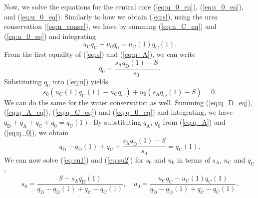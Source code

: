 \documentclass{article}
\numberwithin{equation}{section} %
\begin{document}
Now, we solve the equations for the central core (\ref{eq:q_0_eq}), (\ref{eq:s_0_eq}), and (\ref{eq:u_0_eq}).
Similarly to how we obtain (\ref{eq:s}), using the urea conservation (\ref{eq:u_consv}), we have by summing (\ref{eq:u_C_eq}) and (\ref{eq:u_0_eq}) and integrating
\begin{equation}\label{eq:u}
    u_\mathrm{C}q_\mathrm{C}+u_0q_0 = u_\mathrm{C}(1)q_\mathrm{C}(1).
\end{equation}
From the first equality of (\ref{eq:s}) and (\ref{eq:q_A}), we can write
\begin{equation}\label{eq:q_0}
    q_0 =\frac{s_\mathrm{A}q_\mathrm{D}(1)-S}{s_0}.
\end{equation}
Substituting $q_0$ into (\ref{eq:u}) yields
\begin{equation}\label{eq:su1}
    s_0\left( u_\mathrm{C}(1)q_\mathrm{C}(1) - u_\mathrm{C}q_\mathrm{C} \right) + u_0\left( s_\mathrm{A}q_\mathrm{D}(1) - S \right) = 0.
\end{equation}
We can do the same for the water conservation as well.
Summing (\ref{eq:q_D_eq}), (\ref{eq:q_A_eq}), (\ref{eq:q_C_eq}) and (\ref{eq:q_0_eq}) and integrating, we have $q_\mathrm{D}+q_\mathrm{A}+q_\mathrm{C}+q_0 = q_\mathrm{C}(1)$.
By substituting $q_\mathrm{A}$, $q_0$ from (\ref{eq:q_A}) and (\ref{eq:q_0}), we obtain
\begin{equation}\label{eq:su2}
    q_\mathrm{D}-q_\mathrm{D}(1)+q_\mathrm{C}+\frac{s_\mathrm{A}q_\mathrm{D}(1) - S}{s_0} = q_\mathrm{C}(1).
\end{equation}
We can now solve (\ref{eq:su1}) and (\ref{eq:su2}) for $s_0$ and $u_0$ in terms of $\mathrm{s}_A$, $u_\mathrm{C}$ and $q_\mathrm{C}$:
\begin{equation}\label{eq:su}
    s_0 = \frac{S-s_\mathrm{A}q_\mathrm{D}(1)}{q_\mathrm{D} - q_\mathrm{D}(1)+q_\mathrm{C} - q_\mathrm{C}(1)},\quad u_0 = \frac{u_\mathrm{C}q_\mathrm{C} - u_\mathrm{C}(1)q_\mathrm{C}(1)}{q_\mathrm{D} - q_\mathrm{D}(1)+q_\mathrm{C} - q_\mathrm{C}(1)}.
\end{equation}
\end{document}
